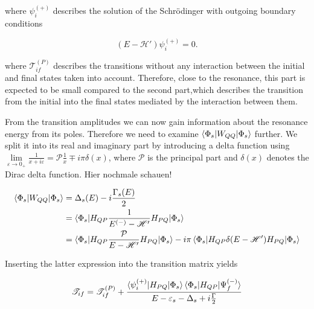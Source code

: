 where $\psi_i^{(+)}$ describes the solution of the Schrödinger with outgoing
boundary conditions

\begin{equation}                                                              
  (E - \mathscr{H}') \psi_i^{(+)} = 0 .                                       
\end{equation}

where $\mathscr{T}_{if}^{(P)}$ describes the transitions without any interaction
between the initial and final states taken into account. Therefore, close to   
the resonance, this part is expected to be small compared to the second part,which
describes the transition
from the initial into the final states mediated by the interaction between them.

From the transition amplitudes we can now gain information about
the resonance energy from its poles. Therefore we need to examine
$\braket{\Phi_s|W_{QQ}|\Phi_s}$ further.
We split it into
its real and imaginary part by introducing a delta function using 
$\lim\limits_{\varepsilon \to 0_+} \frac{1}{x+i\varepsilon} = \mathscr{P} \frac 1x \mp i\pi\delta(x)$,
where $\mathscr{P}$ is the principal part and $\delta(x)$ denotes the
Dirac delta function. \cite{Cohen_Tannoudji_3_2}
Hier nochmale schauen!

\begin{align}
  \braket{\Phi_s|W_{QQ}|\Phi_s} & = \Delta_s(E) - i \frac{\Gamma_s(E)}{2}\\
                                & = \braket{\Phi_s|H_{QP}
                                    \frac{1}{E^{(-)}  - \mathscr{H}'}H_{PQ}|\Phi_s}\\
                                & = \braket{\Phi_s|H_{QP}
                                    \frac{\mathcal{P}}{E - \mathscr{H}'}H_{PQ}|\Phi_s}
                                    - i\pi \braket{\Phi_s|H_{QP}\delta(E-\mathscr{H}')H_{PQ}
                                    |\Phi_s} 
\end{align}

Inserting the latter expression into the transition matrix yields

\begin{equation}
  \mathscr{T}_{if} = \mathscr{T}_{if}^{(P)} + 
                     \frac{\braket{\psi_i^{(+)}|H_{PQ}|\Phi_s}
                           \braket{\Phi_s|H_{QP}|\Psi_f^{(-)}}}
                          {E-\varepsilon_s - \Delta_s + i \frac{\Gamma}{2}}
\end{equation}

